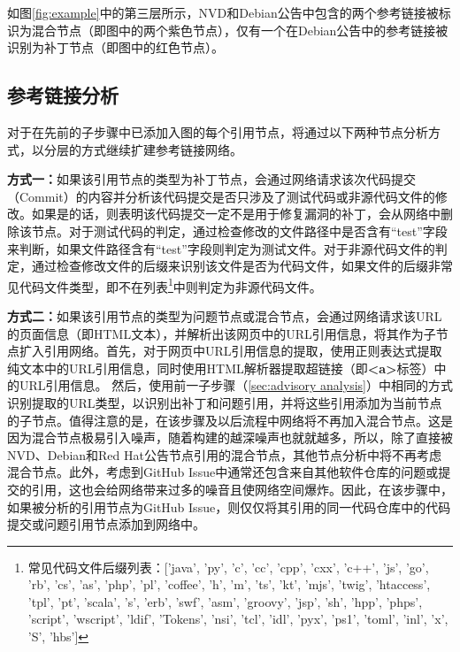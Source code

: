 
\begin{exmp}
如图\ref{fig:example}中的第三层所示，NVD和Debian公告中包含的两个参考链接被标识为混合节点（即图中的两个紫色节点），仅有一个在Debian公告中的参考链接被识别为补丁节点（即图中的红色节点）。
\end{exmp}

\subsection{参考链接分析}
对于在先前的子步骤中已添加入图的每个引用节点，\tool 将通过以下两种节点分析方式，以分层的方式继续扩建参考链接网络。%

\textbf{方式一：}如果该引用节点的类型为补丁节点，\tool 会通过网络请求该次代码提交（Commit）的内容并分析该代码提交是否只涉及了测试代码或非源代码文件的修改。如果是的话，则表明该代码提交一定不是用于修复漏洞的补丁，\tool 会从网络中删除该节点。对于测试代码的判定，\tool 通过检查修改的文件路径中是否含有“test”字段来判断，如果文件路径含有“test”字段则判定为测试文件。对于非源代码文件的判定，\tool 通过检查修改文件的后缀来识别该文件是否为代码文件，如果文件的后缀非常见代码文件类型，即不在列表\footnote{常见代码文件后缀列表：['java', 'py', 'c', 'cc', 'cpp', 'cxx', 'c++', 'js', 'go', 'rb', 'cs', 'as', 'php', 'pl', 'coffee', 'h', 'm', 'ts', 'kt', 'mjs', 'twig', 'htaccess', 'tpl', 'pt', 'scala', 's', 'erb', 'swf', 'asm', 'groovy', 'jsp', 'sh', 'hpp', 'phps', 'script', 'wscript', 'ldif', 'Tokens', 'nsi', 'tcl', 'idl', 'pyx', 'ps1', 'toml', 'inl', 'x', 'S', 'hbs']}中则判定为非源代码文件。

\textbf{方式二：}如果该引用节点的类型为问题节点或混合节点，\tool 会通过网络请求该URL的页面信息（即HTML文本），并解析出该网页中的URL引用信息，将其作为子节点扩入引用网络。首先，对于网页中URL引用信息的提取，\tool 使用正则表达式提取纯文本中的URL引用信息，同时使用HTML解析器提取超链接（即\textbf{<a>}标签）中的URL引用信息。
然后，使用前一子步骤（\ref{sec:advisory analysis}）中相同的方式识别提取的URL类型，以识别出补丁和问题引用，并将这些引用添加为当前节点的子节点。值得注意的是，在该步骤及以后流程中网络将不再加入混合节点。这是因为混合节点极易引入噪声，随着构建的越深噪声也就就越多，所以，除了直接被NVD、Debian和Red Hat公告节点引用的混合节点，其他节点分析中将不再考虑混合节点。此外，考虑到GitHub Issue中通常还包含来自其他软件仓库的问题或提交的引用，这也会给网络带来过多的噪音且使网络空间爆炸。因此，在该步骤中，如果被分析的引用节点为GitHub Issue，则仅仅将其引用的同一代码仓库中的代码提交或问题引用节点添加到网络中。

